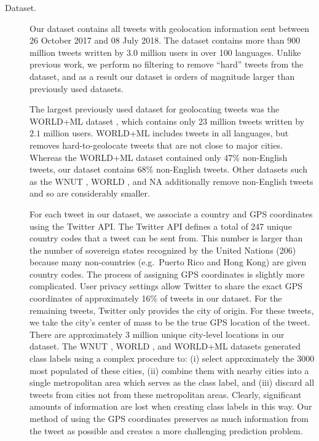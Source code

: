 \documentclass[sigconf,anonymous,review]{acmart}
\renewcommand{\times}{\mathbin{\tikz [x=1.4ex,y=1.4ex,line width=.1ex] \draw (0,0) -- (1,1) (0,1) -- (1,0);}}%
\begin{document}
\begin{description}

\item[Dataset.]
Our dataset contains all tweets with geolocation information sent between 26 October 2017 and 08 July 2018.
The dataset contains more than 900 million tweets written by $3.0$ million users in over 100 languages.
Unlike previous work, 
we perform no filtering to remove ``hard'' tweets from the dataset,
and as a result our dataset is orders of magnitude larger than previously used datasets.

The largest previously used dataset for geolocating tweets was the WORLD+ML dataset \citep{han2014text},
which contains only $23$ million tweets written by $2.1$ million users.
WORLD+ML includes tweets in all languages,
but removes hard-to-geolocate tweets that are not close to major cities.
Whereas the WORLD+ML dataset contained only 47\% non-English tweets,
our dataset contains 68\% non-English tweets.
Other datasets such as the WNUT \citep{han2016twitter}, WORLD \citep{han2012geolocation}, and NA \citep{roller2012supervised}
additionally remove non-English tweets and so are considerably smaller.

For each tweet in our dataset, we associate a country and GPS coordinates using the Twitter API.
The Twitter API defines a total of 247 unique country codes that a tweet can be sent from.
This number is larger than the number of sovereign states recognized by the United Nations (206)
because many non-countries (e.g.\ Puerto Rico and Hong Kong) are given country codes.
The process of assigning GPS coordinates is slightly more complicated.
User privacy settings allow Twitter to share the exact GPS coordinates of approximately 16\% of tweets in our dataset.
For the remaining tweets, Twitter only provides the city of origin.
For these tweets, we take the city's center of mass to be the true GPS location of the tweet.
There are approximately 3 million unique city-level locations in our dataset.
The WNUT \citep{han2016twitter}, WORLD \citep{han2012geolocation}, and WORLD+ML \citep{han2014text} datasets generated class labels using a complex procedure to:
(i) select approximately the 3000 most populated of these cities,
(ii) combine them with nearby cities into a single metropolitan area which serves as the class label,
and (iii) discard all tweets from cities not from these metropolitan areas.
Clearly, significant amounts of information are lost when creating class labels in this way.
Our method of using the GPS coordinates preserves as much information from the tweet as possible and creates a more challenging prediction problem.


\end{description}
\end{document}
